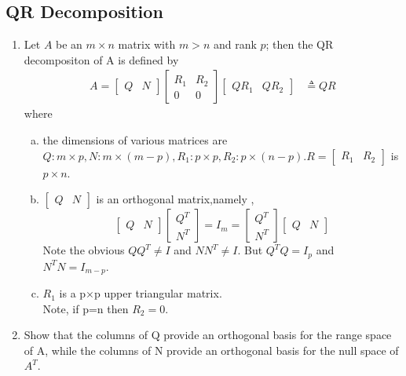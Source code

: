 \documentclass[journal,12pt,twocolumn]{IEEEtran}
\begin{document}
\subsection{QR Decomposition}
\begin{enumerate}
\item 
Let  $A$ be an $m\times n$ matrix with $m > n$ and rank $p$; then the QR decompositon of A is defined by
\begin{align*}
A=\begin{bmatrix}
Q & N
\end{bmatrix}
\begin{bmatrix}
R_1 & R_2\\
0 & 0
\end{bmatrix}
\begin{bmatrix}
QR_1 & QR_2
\end{bmatrix}
&\triangleq QR
\end{align*}
where
\begin{enumerate}[(a)]
\item the dimensions of various matrices are $Q: m\times p, N:m \times(m-p), R_1: p\times p, R_2:p\times(n-p).
R=\begin{bmatrix} R_1&R_2\end{bmatrix}$ is $p\times n$.
\item $\begin{bmatrix}Q&N\end{bmatrix}$ is an orthogonal matrix,namely ,
\begin{equation}
\begin{bmatrix}Q&N\end{bmatrix}
\begin{bmatrix}Q^T\\N^T\end{bmatrix}=I_m=\begin{bmatrix}Q^T\\N^T\end{bmatrix}
\begin{bmatrix}Q&N\end{bmatrix}
\end{equation}
Note the obvious $QQ^T\neq I$ and $NN^T\neq I$. But $Q^TQ=I_{p}$ and $N^TN=I_{m-p}.$
\item $R_1$ is a p$\times$p upper triangular matrix.\\
Note, if p=n then $R_2=0.$
\end{enumerate}
\item Show that the columns of Q provide an orthogonal basis for the range space of A, while the columns of N provide an orthogonal basis for the null space of $A^T$.

\end{enumerate}
\end{document}
